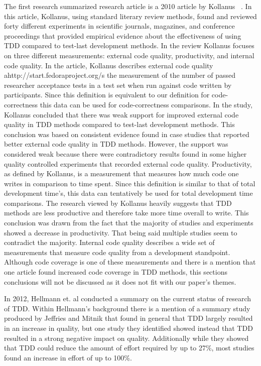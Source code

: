 \documentclass{sig-alternate}
\begin{document}
The first research summarized research article  is a 2010 article by Kollanus ~\cite{Kollanus:2010}.  In this article, Kollanus, using standard literary review methods, found and reviewed forty different experiments in scientific journals, magazines, and conference proceedings that provided empirical evidence about the effectiveness of using TDD compared to test-last development methods.  In the review Kollanus focuses on three different measurements: external code quality, productivity, and internal code quality.  In the article, Kollanus describes external code quality ahttp://start.fedoraproject.org/s the measurement of the number of passed researcher acceptance tests in a test set when run against code written by participants.  Since this definition is equivalent to our definition for code-correctness this data can be used for code-correctness comparisons. In the study, Kollanus concluded that there was weak support for improved external code quality in TDD methods compared to test-last development methods.  This conclusion was based on consistent evidence found in case studies that reported better external code quality in TDD methods.  However, the support was considered weak because there were contradictory results found in some higher quality controlled experiments that recorded external code quality.  Productivity, as defined by Kollanus, is a measurement that measures how much code one writes in comparison to time spent.  Since this definition is similar to that of total development time's, this data can tentatively be used for total development time comparisons.  The research viewed by Kollanus heavily suggests that TDD methods are less productive and therefore take more time overall to write.  This conclusion was drawn from the fact that the majority of studies and experiments showed a decrease in productivity.  That being said multiple studies seem to contradict the majority.   Internal code quality describes a wide set of measurements that measure code quality from a development standpoint.  Although code coverage is one of these measurements and there is a mention that one article found increased code coverage in TDD methods, this sections conclusions will not be discussed as it does not fit with our paper's themes.

In 2012, Hellmann et. al conducted a summary on the current status of research of TDD.  Within Hellmann's background there is a mention of a summary study produced by Jeffries and Mitnik that found in general that TDD largely resulted in an increase in quality, but one study they identified showed instead that TDD resulted in a strong negative impact on quality.  Additionally while they showed that TDD could reduce the amount of effort required by up to 27\%, most studies found an increase in effort of up to 100\%.
\end{document}
